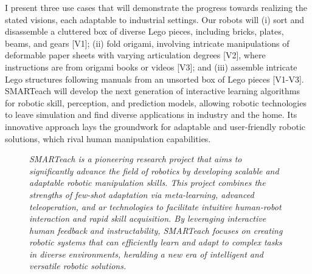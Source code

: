 \documentclass{erc-B2}
\begin{document}
I present three use cases that will demonstrate the progress towards realizing the stated visions, each adaptable to industrial settings. Our robots will (i) sort and disassemble a cluttered box of diverse Lego pieces, including bricks, plates, beams, and gears [V1]; (ii) fold origami, involving intricate manipulations of deformable paper sheets with varying articulation degrees [V2], where instructions are from origami books or videos [V3]; and (iii) assemble intricate Lego structures following manuals from an unsorted box of Lego pieces [V1-V3].
SMARTeach will develop the next generation of interactive learning algorithms for robotic skill, perception, and prediction models, allowing robotic technologies to leave simulation and find diverse applications in industry and the home. 
Its innovative approach lays the groundwork for adaptable and user-friendly robotic solutions, which rival human manipulation capabilities.

\begin{figure}[t]
    \centering
    \resizebox{0.95\textwidth}{!}{}
    \caption{\textit{\small
    SMARTeach is a pioneering research project that aims to significantly advance the field of robotics by developing scalable and adaptable robotic manipulation skills. This project combines the strengths of few-shot adaptation via meta-learning, advanced teleoperation, and \gls*{ar} technologies to facilitate intuitive human-robot interaction and rapid skill acquisition. By leveraging interactive human feedback and instructability, SMARTeach focuses on creating robotic systems that can efficiently learn and adapt to complex tasks in diverse environments, heralding a new era of intelligent and versatile robotic solutions\protect\footnotemark. %
    }}
    \label{fig:interfaces}
    \end{figure}
\end{document}
